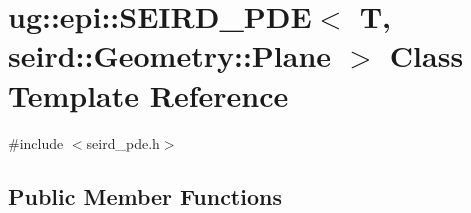 \hypertarget{classug_1_1epi_1_1_s_e_i_r_d___p_d_e_3_01_t_00_01seird_1_1_geometry_1_1_plane_01_4}{}\section{ug\+:\+:epi\+:\+:S\+E\+I\+R\+D\+\_\+\+P\+DE$<$ T, seird\+:\+:Geometry\+:\+:Plane $>$ Class Template Reference}
\label{classug_1_1epi_1_1_s_e_i_r_d___p_d_e_3_01_t_00_01seird_1_1_geometry_1_1_plane_01_4}


{\ttfamily \#include $<$seird\+\_\+pde.\+h$>$}

\subsection*{Public Member Functions}

